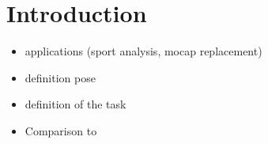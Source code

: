 \section{Introduction}


\begin{itemize}
	\item applications (sport analysis, mocap replacement)
	\item definition pose
	\item definition of the task
	\item Comparison to \citet{wandt19}
\end{itemize}